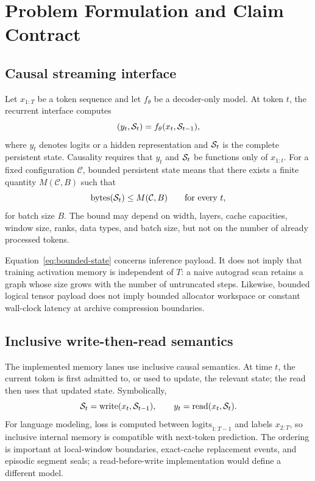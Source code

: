 \section{Problem Formulation and Claim Contract}
\label{sec:problem-contract}

\subsection{Causal streaming interface}

Let \(x_{1:T}\) be a token sequence and let \(f_\theta\) be a decoder-only
model. At token \(t\), the recurrent interface computes
\begin{equation}
  (y_t,\mathcal{S}_t)=f_\theta(x_t,\mathcal{S}_{t-1}),
  \label{eq:stream-interface}
\end{equation}
where \(y_t\) denotes logits or a hidden representation and \(\mathcal{S}_t\) is
the complete persistent state. Causality requires that \(y_t\) and
\(\mathcal{S}_t\) be functions only of \(x_{1:t}\). For a fixed configuration
\(\mathcal{C}\), bounded persistent state means that there exists a finite
quantity \(M(\mathcal{C},B)\) such that
\begin{equation}
  \operatorname{bytes}(\mathcal{S}_t)\le M(\mathcal{C},B)
  \qquad \text{for every }t,
  \label{eq:bounded-state}
\end{equation}
for batch size \(B\). The bound may depend on width, layers, cache capacities,
window size, ranks, data types, and batch size, but not on the number of
already processed tokens.

Equation~\eqref{eq:bounded-state} concerns inference payload. It does not imply
that training activation memory is independent of \(T\): a naive autograd
scan retains a graph whose size grows with the number of untruncated steps.
Likewise, bounded logical tensor payload does not imply bounded allocator
workspace or constant wall-clock latency at archive compression boundaries.

\subsection{Inclusive write-then-read semantics}

The implemented memory lanes use inclusive causal semantics. At time \(t\),
the current token is first admitted to, or used to update, the relevant state;
the read then uses that updated state. Symbolically,
\begin{equation}
  \mathcal{S}_t=\operatorname{write}(x_t,\mathcal{S}_{t-1}),\qquad
  y_t=\operatorname{read}(x_t,\mathcal{S}_t).
  \label{eq:write-read}
\end{equation}
For language modeling, loss is computed between
\(\mathrm{logits}_{1:T-1}\) and labels \(x_{2:T}\), so inclusive internal
memory is compatible with next-token prediction. The ordering is important at
local-window boundaries, exact-cache replacement events, and episodic segment
seals; a read-before-write implementation would define a different model.

